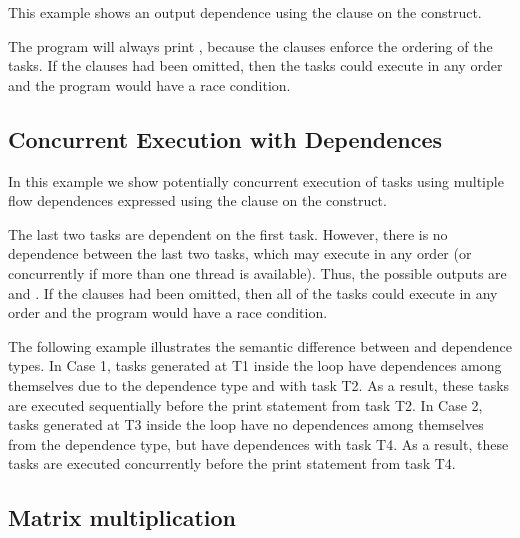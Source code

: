 This example shows an output dependence using the  
clause on the  construct.



The program will always print , because the  
clauses enforce the ordering of the tasks. If the  clauses had been 
omitted, then the tasks could execute in any order and the program would have a 
race condition.

\pagebreak
\subsection{Concurrent Execution with Dependences}
\label{subsec:task_concurrent_depend}

In this example we show potentially concurrent execution of tasks using multiple 
flow dependences expressed using the  clause on the  
construct.

The last two tasks are dependent on the first task. However, there is no dependence 
between the last two tasks, which may execute in any order (or concurrently if 
more than one thread is available). Thus, the possible outputs are 
 and . 
If the  clauses had been omitted, then all of the tasks could execute 
in any order and the program would have a race condition.



The following example illustrates the semantic difference between 
and  dependence types.  In Case 1, tasks generated at T1
inside the loop have dependences among themselves due to 
the  dependence type and with task T2.
As a result, these tasks are executed sequentially before the print
statement from task T2.
In Case 2, tasks generated at T3 inside the loop have no dependences
among themselves from the  dependence type, but have 
dependences with task T4.
As a result, these tasks are executed concurrently before the print
statement from task T4.



\subsection{Matrix multiplication}
\label{subsec:task_matrix_mult}

